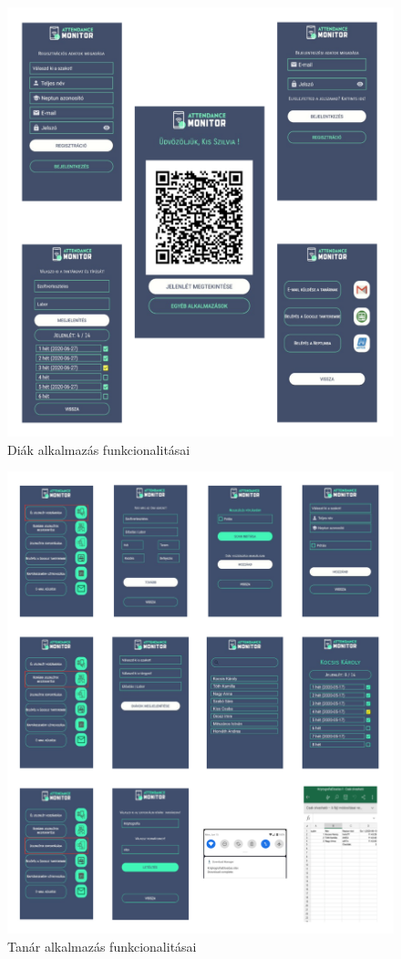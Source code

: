 \begin{figure}
	\includegraphics[width=\textwidth]{figures/stud1.png}
	\caption{Diák alkalmazás funkcionalitásai}
	\label{fig:stud1}
\end{figure}

\begin{figure}
	\includegraphics[width=\textwidth]{figures/teach1.png}
	\caption{Tanár alkalmazás funkcionalitásai}
	\label{fig:teach1}
\end{figure}